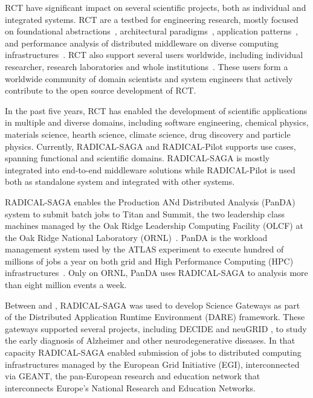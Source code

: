 \documentclass[preprint,12pt, a4paper]{elsarticle}
\begin{document}
RCT have significant impact on several scientific projects, both as
individual and integrated systems. RCT are a testbed for engineering
research, mostly focused on foundational abstractions~\cite{}, architectural
paradigms~\cite{}, application patterns~\cite{}, and performance analysis of
distributed middleware on diverse computing infrastructures~\cite{}. RCT also
support several users worldwide, including individual researcher, research
laboratories and whole institutions~\cite{}. These users form a worldwide
community of domain scientists and system engineers that actively contribute
to the open source development of RCT.

In the past five years, RCT has enabled the development of scientific
applications in multiple and diverse domains, including software engineering,
chemical physics, materials science, hearth science, climate science, drug
discovery and particle physics. Currently, RADICAL-SAGA and RADICAL-Pilot
supports  use cases, spanning functional and scientific
domains. RADICAL-SAGA is mostly integrated into end-to-end middleware
solutions while RADICAL-Pilot is used both as standalone system and
integrated with other systems.

RADICAL-SAGA enables the Production ANd Distributed Analysis (PanDA) system
to submit batch jobs to Titan and Summit, the two leadership class machines
managed by the Oak Ridge Leadership Computing Facility (OLCF) at the Oak
Ridge National Laboratory (ORNL)~\cite{}. PanDA is the workload management
system used by the ATLAS experiment to execute hundred of millions of jobs a
year on both grid and High Performance Computing (HPC)
infrastructures~\cite{}. Only on ORNL, PanDA uses RADICAL-SAGA to analysis
more than eight million events a week.

Between  and , RADICAL-SAGA was used to
develop Science Gateways as part of the Distributed Application Runtime
Environment (DARE) framework. These gateways supported several projects,
including DECIDE and neuGRID , to study the early diagnosis
of Alzheimer and other neurodegenerative diseases. In that capacity
RADICAL-SAGA enabled submission of jobs to distributed computing
infrastructures managed by the European Grid Initiative (EGI), interconnected
via GEANT, the pan-European research and education network that interconnects
Europe’s National Research and Education Networks.

\end{document}
